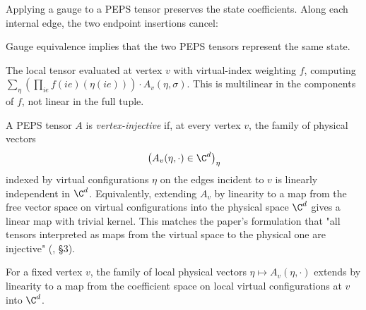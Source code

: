\begin{theorem}%
    \label{thm:applyGauge_stateCoeff}
    \leanok
    Applying a gauge to a PEPS tensor preserves the state coefficients.
    Along each internal edge, the two endpoint insertions cancel:
    \begin{center}
        \TNPEPSGaugeCancellation
    \end{center}
\end{theorem}

\begin{theorem}%
    \label{thm:GaugeEquiv_sameState}
    \leanok
    Gauge equivalence implies that the two PEPS tensors represent the same state.
\end{theorem}

\begin{definition}%
    \label{def:localTensorEval}
    \leanok
    The local tensor evaluated at vertex $v$ with virtual-index weighting $f$,
    computing $\sum_\eta (\prod_{ie} f(ie)(\eta(ie))) \cdot A_v(\eta, \sigma)$.
    This is multilinear in the components of $f$, not linear in the full tuple.
\end{definition}

\begin{definition}%
    \label{def:IsVertexInjective}
    \leanok
    A PEPS tensor $A$ is \emph{vertex-injective} if, at every vertex $v$, the
    family of physical vectors
    \[
        \bigl(A_v(\eta, \cdot) \in \C^d\bigr)_{\eta}
    \]
    indexed by virtual configurations $\eta$ on the edges incident to $v$ is
    linearly independent in $\C^d$. Equivalently, extending $A_v$ by linearity
    to a map from the free vector space on virtual configurations into the
    physical space $\C^d$ gives a linear map with trivial kernel. This matches
    the paper's formulation that "all tensors interpreted as maps from the
    virtual space to the physical one are injective"
    (\cite{Molnar2018NormalPEPS}, §3).
\end{definition}

\begin{definition}%
    \label{def:peps_localTensorMap}
    \leanok
    For a fixed vertex $v$, the family of local physical vectors
    $\eta \mapsto A_v(\eta, \cdot)$ extends by linearity to a map from the
    coefficient space on local virtual configurations at $v$ into $\C^d$.
\end{definition}

